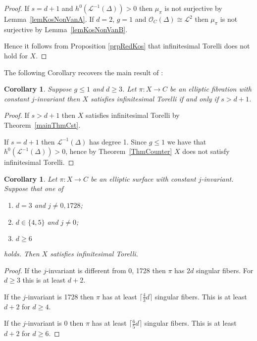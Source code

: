 \documentclass{amsart}
\newcommand{\cL}{\mathcal{L}}
\newcommand{\cO}{\mathcal{O}}
\newtheorem{corollary}[theorem]{Corollary}
\theoremstyle{definition}
\theoremstyle{remark}
\begin{document}
\begin{proof}
If $s=d+1$ and  $h^0(\cL^{-1}(\Delta))>0$ then $ \mu_\pi$ is not surjective by Lemma~\ref{lemKosNonVanA}.
If $d=2$, $g=1$  and $\cO_C(\Delta)\cong\cL^2$ then $\mu_\pi$ is not surjective by Lemma~\ref{lemKosNonVanB}.

Hence it follows from Proposition \ref{prpRedKos} that infinitesimal Torelli does not hold for $X$.
\end{proof}



The following Corollary recovers the main result of  \cite{Ext}:
 \begin{corollary} Suppose $g\leq 1$ and $d\geq 3$. Let $\pi:X \to C$ be an elliptic fibration with constant $j$-invariant then $X$ satisfies infinitesimal Torelli if and only if $s>d+1$.
 \end{corollary}
 \begin{proof}
 If $s>d+1$ then $X$ satisfies infinitesimal Torelli by Theorem~\ref{mainThmCst}. 
 
 If $s=d+1$ then $\cL^{-1}(\Delta)$ has degree 1. Since $g\leq 1$ we have that $h^0(\cL^{-1}(\Delta))>0$, hence by Theorem~\ref{ThmCounter} $X$ does not satisfy infinitesimal Torelli.
 \end{proof}
 
\begin{corollary} Let $\pi: X\to C$ be an elliptic surface with constant $j$-invariant.
Suppose that one of 
\begin{enumerate}
\item $d=3$ and $j\neq 0, 1728$;
\item $d\in \{4,5\}$ and $j\neq 0$;
\item  $d\geq 6$
\end{enumerate}
holds. Then  $X$ satisfies infinitesimal Torelli.
\end{corollary}

\begin{proof}
If the $j$-invariant is different from 0, 1728 then $\pi$ has $2d$ singular fibers. For $d\geq 3$ this is at least $d+2$.

If the $j$-invariant is 1728 then $\pi$ has at least $\lceil \frac{4}{3}d \rceil$ singular fibers. This is at least $d+2$ for $d\geq 4$.

If the $j$-invariant is 0 then $\pi$ has at least $\lceil \frac{6}{5}d \rceil$ singular fibers. This is at least $d+2$ for $d\geq 6$.
\end{proof}
\end{document}
